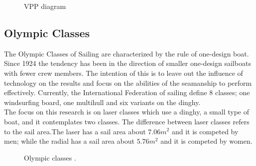 \begin{figure}[ht]
  \centering
  \hfill
  \caption{VPP diagram}
\label{vpp_diag} 
\end{figure}

\subsection {Olympic Classes}
The Olympic Classes of Sailing are characterized by the rule of one-design boat. Since 1924 the tendency  has been in the direction of smaller one-design sailboats with fewer crew members. The intention of this is to leave out the influence of technology on the results and focus on the abilities of the seamanship to perform effectively. Currently, the International Federation of sailing define 8 classes;  one windsurfing board, one multihull and six variants on the dinghy. \\The focus on this research is on laser classes which use a dinghy, a small type of boat, and it contemplates two classes.  %
The difference between laser classes refers to the sail area.The laser has a sail area about $7.06 m^2$  and it is competed by men; while the radial has a sail area about  $5.76 m^2$ and it is competed by women.

\begin{figure}[ht]
  \centering
  \hfill
  \caption{Olympic classes \cite{sailoly}.}
\label{laser} 
\end{figure}


